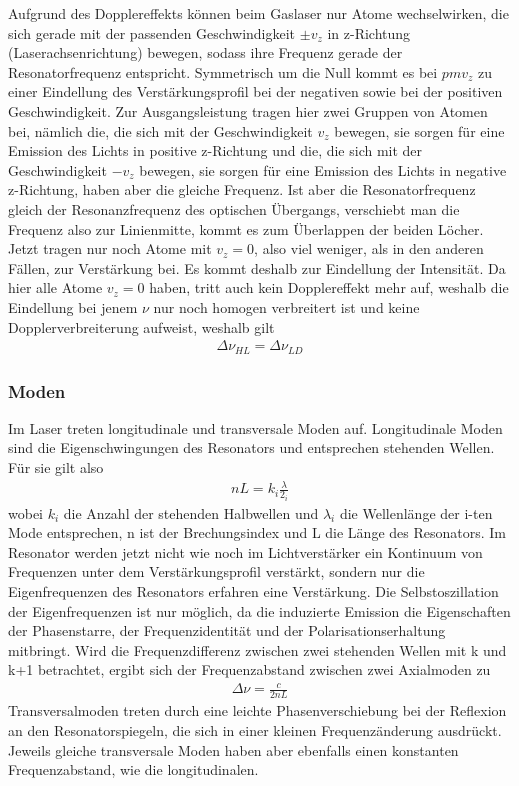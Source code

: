 \documentclass[a4paper,twoside,final]{article}
\begin{document}
Aufgrund des Dopplereffekts können beim Gaslaser nur Atome wechselwirken, die sich gerade mit der passenden Geschwindigkeit $\pm v_z$ in z-Richtung (Laserachsenrichtung) bewegen, sodass ihre Frequenz gerade der Resonatorfrequenz entspricht.  Symmetrisch um die Null kommt es bei $pm v_z$ zu einer Eindellung des Verstärkungsprofil bei der negativen sowie bei der positiven Geschwindigkeit. Zur Ausgangsleistung tragen hier zwei Gruppen von Atomen bei, nämlich die, die sich mit der Geschwindigkeit $v_z$ bewegen, sie sorgen für eine Emission des Lichts in positive z-Richtung und die, die sich mit der Geschwindigkeit $-v_z$ bewegen, sie sorgen für eine Emission des Lichts in negative z-Richtung, haben aber die gleiche Frequenz. Ist aber die Resonatorfrequenz gleich der Resonanzfrequenz des optischen Übergangs, verschiebt man die Frequenz also zur Linienmitte, kommt es zum Überlappen der beiden Löcher. Jetzt tragen nur noch Atome mit $v_z = 0$, also viel weniger, als in den anderen Fällen, zur Verstärkung bei. Es kommt deshalb zur Eindellung der Intensität. Da hier alle Atome $v_z = 0 $ haben, tritt auch kein Dopplereffekt mehr auf, weshalb die Eindellung bei jenem $\nu$ nur noch homogen verbreitert ist und keine Dopplerverbreiterung aufweist, weshalb gilt
\begin{align}
  \Delta \nu_{HL} = \Delta \nu_{LD}
\end{align}


\subsubsection{Moden}
Im Laser treten longitudinale und transversale Moden  auf. Longitudinale Moden sind die Eigenschwingungen des Resonators und entsprechen stehenden Wellen. Für sie gilt also
\begin{align}
  n L = k_i \frac{\lambda}{2_i}
\end{align}
wobei $k_i$ die Anzahl der stehenden Halbwellen und $\lambda_i$ die Wellenlänge der i-ten Mode entsprechen, n ist der Brechungsindex und L die Länge des Resonators. Im Resonator werden jetzt nicht wie noch im Lichtverstärker ein Kontinuum von Frequenzen unter dem Verstärkungsprofil verstärkt, sondern nur die Eigenfrequenzen des Resonators erfahren eine Verstärkung. Die Selbstoszillation der Eigenfrequenzen ist nur möglich, da die induzierte Emission die Eigenschaften der Phasenstarre, der Frequenzidentität und der Polarisationserhaltung mitbringt. Wird die Frequenzdifferenz zwischen zwei stehenden Wellen mit k und k+1 betrachtet, ergibt sich der Frequenzabstand zwischen zwei Axialmoden zu
\begin{align}
  \Delta \nu = \frac{c}{2nL}
\end{align}
Transversalmoden treten durch eine leichte Phasenverschiebung bei der Reflexion an den Resonatorspiegeln, die sich in einer kleinen Frequenzänderung ausdrückt. Jeweils gleiche transversale Moden haben aber ebenfalls einen konstanten Frequenzabstand, wie die longitudinalen.
\end{document}
